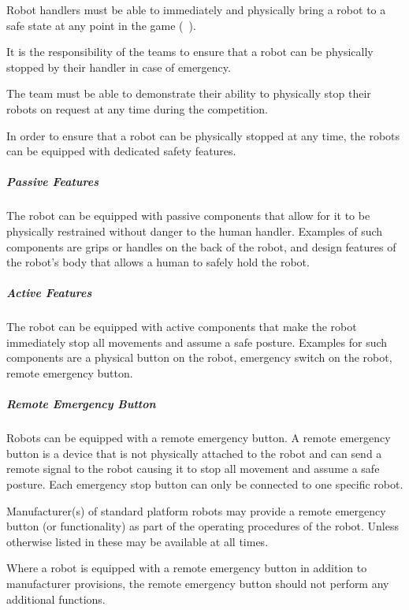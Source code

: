 Robot handlers must be able to immediately and physically bring a robot to a safe state at any point in the game (\cf~). 

It is the responsibility of the teams to ensure that a robot can be physically stopped by their handler in case of emergency.



The team must be able to demonstrate their ability to physically stop their robots on request at any time during the competition.

In order to ensure that a robot can be physically stopped at any time, the robots can be equipped with dedicated safety features.

\subparagraph{Passive Features}
The robot can be equipped with passive components that allow for it to be physically restrained without danger to the human handler.
Examples of such components are grips or handles on the back of the robot, and design features of the robot's body that allows a human to safely hold the robot.

\subparagraph{Active Features}
The robot can be equipped with active components that make the robot immediately stop all movements and assume a safe posture.
Examples for such components are a physical button on the robot, emergency switch on the robot, remote emergency button.

\subparagraph{Remote Emergency Button}
Robots can be equipped with a remote emergency button.
A remote emergency button is a device that is not physically attached to the robot and can send a remote signal to the robot causing it to stop all movement and assume a safe posture.
Each emergency stop button can only be connected to one specific robot.

Manufacturer(s) of standard platform robots may provide a remote emergency button (or functionality) as part of the operating procedures of the robot. Unless otherwise listed in  these may be available at all times. 

Where a robot is equipped with a remote emergency button in addition to manufacturer provisions, the remote emergency button should not perform any additional functions.

